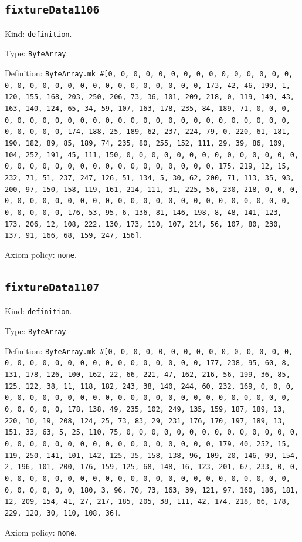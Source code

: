 \documentclass[11pt]{article}
\begin{document}
\subsection*{\texttt{fixtureData1106}}
\noindent Kind: \texttt{definition}.\par
\noindent Type: \texttt{ByteArray}.\par
\noindent Definition: \texttt{ByteArray.mk \#[0, 0, 0, 0, 0, 0, 0, 0, 0, 0, 0, 0, 0, 0, 0, 0, 0, 0, 0, 0, 0, 0, 0, 0, 0, 0, 0, 0, 0, 0, 0, 173, 42, 46, 199, 1, 120, 155, 168, 203, 250, 206, 73, 36, 101, 209, 218, 0, 119, 149, 43, 163, 140, 124, 65, 34, 59, 107, 163, 178, 235, 84, 189, 71, 0, 0, 0, 0, 0, 0, 0, 0, 0, 0, 0, 0, 0, 0, 0, 0, 0, 0, 0, 0, 0, 0, 0, 0, 0, 0, 0, 0, 0, 0, 0, 174, 188, 25, 189, 62, 237, 224, 79, 0, 220, 61, 181, 190, 182, 89, 85, 189, 74, 235, 80, 255, 152, 111, 29, 39, 86, 109, 104, 252, 191, 45, 111, 150, 0, 0, 0, 0, 0, 0, 0, 0, 0, 0, 0, 0, 0, 0, 0, 0, 0, 0, 0, 0, 0, 0, 0, 0, 0, 0, 0, 0, 0, 0, 0, 175, 219, 12, 15, 232, 71, 51, 237, 247, 126, 51, 134, 5, 30, 62, 200, 71, 113, 35, 93, 200, 97, 150, 158, 119, 161, 214, 111, 31, 225, 56, 230, 218, 0, 0, 0, 0, 0, 0, 0, 0, 0, 0, 0, 0, 0, 0, 0, 0, 0, 0, 0, 0, 0, 0, 0, 0, 0, 0, 0, 0, 0, 0, 0, 176, 53, 95, 6, 136, 81, 146, 198, 8, 48, 141, 123, 173, 206, 12, 108, 222, 130, 173, 110, 107, 214, 56, 107, 80, 230, 137, 91, 166, 68, 159, 247, 156]}.\par
\noindent Axiom policy: \texttt{none}.\par
\subsection*{\texttt{fixtureData1107}}
\noindent Kind: \texttt{definition}.\par
\noindent Type: \texttt{ByteArray}.\par
\noindent Definition: \texttt{ByteArray.mk \#[0, 0, 0, 0, 0, 0, 0, 0, 0, 0, 0, 0, 0, 0, 0, 0, 0, 0, 0, 0, 0, 0, 0, 0, 0, 0, 0, 0, 0, 0, 0, 177, 238, 95, 60, 8, 131, 178, 126, 100, 162, 22, 66, 221, 47, 162, 216, 56, 199, 36, 85, 125, 122, 38, 11, 118, 182, 243, 38, 140, 244, 60, 232, 169, 0, 0, 0, 0, 0, 0, 0, 0, 0, 0, 0, 0, 0, 0, 0, 0, 0, 0, 0, 0, 0, 0, 0, 0, 0, 0, 0, 0, 0, 0, 0, 178, 138, 49, 235, 102, 249, 135, 159, 187, 189, 13, 220, 10, 19, 208, 124, 25, 73, 83, 29, 231, 176, 170, 197, 189, 13, 151, 33, 63, 5, 25, 110, 75, 0, 0, 0, 0, 0, 0, 0, 0, 0, 0, 0, 0, 0, 0, 0, 0, 0, 0, 0, 0, 0, 0, 0, 0, 0, 0, 0, 0, 0, 0, 0, 179, 40, 252, 15, 119, 250, 141, 101, 142, 125, 35, 158, 138, 96, 109, 20, 146, 99, 154, 2, 196, 101, 200, 176, 159, 125, 68, 148, 16, 123, 201, 67, 233, 0, 0, 0, 0, 0, 0, 0, 0, 0, 0, 0, 0, 0, 0, 0, 0, 0, 0, 0, 0, 0, 0, 0, 0, 0, 0, 0, 0, 0, 0, 0, 180, 3, 96, 70, 73, 163, 39, 121, 97, 160, 186, 181, 12, 209, 154, 41, 27, 217, 185, 205, 38, 111, 42, 174, 218, 66, 178, 229, 120, 30, 110, 108, 36]}.\par
\noindent Axiom policy: \texttt{none}.\par
\end{document}
